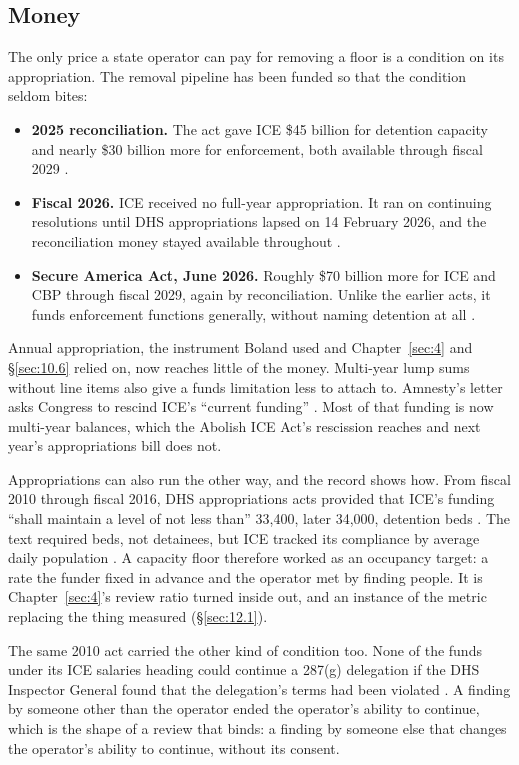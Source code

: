 \subsection{Money}
\label{sec:8.4.3}
The only price a state operator can pay for removing a floor is a condition on its appropriation. The removal pipeline has been funded so that the condition seldom bites:

\begin{itemize}
\item \textbf{2025 reconciliation.} The act gave ICE \$45 billion for detention capacity and nearly \$30 billion more for enforcement, both available through fiscal 2029 \autocite{obbba2025}.
\item \textbf{Fiscal 2026.} ICE received no full-year appropriation. It ran on continuing resolutions until DHS appropriations lapsed on 14 February 2026, and the reconciliation money stayed available throughout \autocite{gao2026detention}.
\item \textbf{Secure America Act, June 2026.} Roughly \$70 billion more for ICE and CBP through fiscal 2029, again by reconciliation. Unlike the earlier acts, it funds enforcement functions generally, without naming detention at all \autocite{secureamerica2026,gao2026detention}.
\end{itemize}

Annual appropriation, the instrument Boland used and Chapter~\ref{sec:4} and \S\ref{sec:10.6} relied on, now reaches little of the money. Multi-year lump sums without line items also give a funds limitation less to attach to. Amnesty's letter asks Congress to rescind ICE's “current funding” \autocite{AmnestyUSA2026Letter}. Most of that funding is now multi-year balances, which the Abolish ICE Act's rescission reaches and next year's appropriations bill does not.

Appropriations can also run the other way, and the record shows how. From fiscal 2010 through fiscal 2016, DHS appropriations acts provided that ICE's funding “shall maintain a level of not less than” 33,400, later 34,000, detention beds \autocite{dhsapprop2010,Geng2018BedQuota}. The text required beds, not detainees, but ICE tracked its compliance by average daily population \autocite{Geng2018BedQuota}. A capacity floor therefore worked as an occupancy target: a rate the funder fixed in advance and the operator met by finding people. It is Chapter~\ref{sec:4}'s review ratio turned inside out, and an instance of the metric replacing the thing measured (\S\ref{sec:12.1}).

The same 2010 act carried the other kind of condition too. None of the funds under its ICE salaries heading could continue a 287(g) delegation if the DHS Inspector General found that the delegation's terms had been violated \autocite{dhsapprop2010}. A finding by someone other than the operator ended the operator's ability to continue, which is the shape of a review that binds: a finding by someone else that changes the operator's ability to continue, without its consent.
